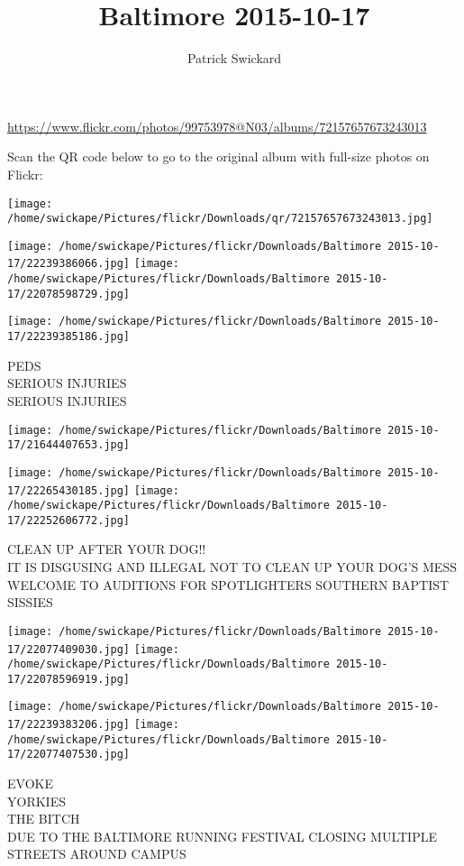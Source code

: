 \documentclass[10pt,letterpaper]{article}
\title{Baltimore 2015-10-17}
\author{Patrick Swickard}
\date{}
\begin{document}
\maketitle

\url{https://www.flickr.com/photos/99753978@N03/albums/72157657673243013}

Scan the QR code below to go to the original album with full-size photos on Flickr:

\texttt{[image: /home/swickape/Pictures/flickr/Downloads/qr/72157657673243013.jpg]}
\pagebreak

\texttt{[image: /home/swickape/Pictures/flickr/Downloads/Baltimore 2015-10-17/22239386066.jpg]}
\texttt{[image: /home/swickape/Pictures/flickr/Downloads/Baltimore 2015-10-17/22078598729.jpg]}

\texttt{[image: /home/swickape/Pictures/flickr/Downloads/Baltimore 2015-10-17/22239385186.jpg]}

PEDS\\
SERIOUS INJURIES\\
SERIOUS INJURIES
\pagebreak

\texttt{[image: /home/swickape/Pictures/flickr/Downloads/Baltimore 2015-10-17/21644407653.jpg]}

\vspace{0.25in}
\texttt{[image: /home/swickape/Pictures/flickr/Downloads/Baltimore 2015-10-17/22265430185.jpg]}
\texttt{[image: /home/swickape/Pictures/flickr/Downloads/Baltimore 2015-10-17/22252606772.jpg]}

CLEAN UP AFTER YOUR DOG!!\\
IT IS DISGUSING AND ILLEGAL NOT TO CLEAN UP YOUR DOG'S MESS\\
WELCOME TO AUDITIONS FOR SPOTLIGHTERS SOUTHERN BAPTIST SISSIES
\pagebreak

\texttt{[image: /home/swickape/Pictures/flickr/Downloads/Baltimore 2015-10-17/22077409030.jpg]}
\texttt{[image: /home/swickape/Pictures/flickr/Downloads/Baltimore 2015-10-17/22078596919.jpg]}

\texttt{[image: /home/swickape/Pictures/flickr/Downloads/Baltimore 2015-10-17/22239383206.jpg]}
\texttt{[image: /home/swickape/Pictures/flickr/Downloads/Baltimore 2015-10-17/22077407530.jpg]}

EVOKE\\
YORKIES\\
THE BITCH\\
DUE TO THE BALTIMORE RUNNING FESTIVAL CLOSING MULTIPLE STREETS AROUND CAMPUS
\pagebreak
\end{document}
